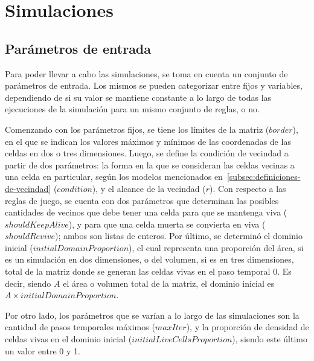 \section{Simulaciones}\label{sec:simulaciones}

\subsection{Parámetros de entrada}\label{subsec:parametros-de-entrada}

Para poder llevar a cabo las simulaciones, se toma en cuenta un conjunto de parámetros de entrada.
Los mismos se pueden categorizar entre fijos y variables, dependiendo de si su valor se mantiene
constante a lo largo de todas las ejecuciones de la simulación para un mismo conjunto de reglas, o no.

Comenzando con los parámetros fijos, se tiene los límites de la matriz ($border$),
en el que se indican los valores máximos y mínimos de las coordenadas de las celdas en dos o tres dimensiones.
Luego, se define la condición de vecindad a partir de dos parámetros:
la forma en la que se consideran las celdas vecinas a una celda en particular, según los modelos mencionados
en~\ref{subsec:definiciones-de-vecindad} ($condition$), y el alcance de la vecindad ($r$).
Con respecto a las reglas de juego, se cuenta con dos parámetros que determinan las posibles cantidades de
vecinos que debe tener una celda para que se mantenga viva ($shouldKeepAlive$),
y para que una celda muerta se convierta en viva ($shouldRevive$); ambos son listas de enteros.
Por último, se determinó el dominio inicial ($initialDomainProportion$), el
cual representa una proporción del área, si es un simulación en dos dimensiones, o del volumen,
si es en tres dimensiones, total de la matriz donde se generan las celdas vivas en el paso temporal 0.
Es decir, siendo $A$ el área o volumen total de la matriz, el dominio inicial es $A \times initialDomainProportion$.

Por otro lado, los parámetros que se varían a lo largo de las simulaciones son la cantidad de pasos temporales
máximos ($maxIter$), y la proporción de densidad de celdas vivas en el dominio inicial ($initialLiveCellsProportion$),
siendo este último un valor entre 0 y 1.